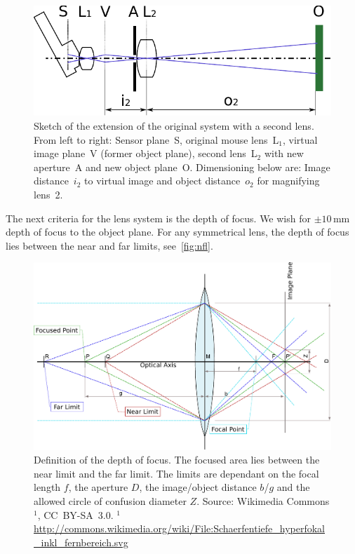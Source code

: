 \documentclass[12pt,a4paper]{article}
\begin{document}
\begin{figure}[htbp]
\begin{center}
\includegraphics[width=1\columnwidth]{figures/sketch-optic-2lens}
\caption{\label{fig:sk2l}
Sketch of the extension of the original system with a second lens.
From left to right: 
Sensor plane~S,
original mouse lens~L$_1$, 
virtual image plane~V (former object plane),
second lens~L$_2$ with new aperture~A and
new object plane~O.
Dimensioning below are: 
Image distance~$i_2$ to virtual image and object distance~$o_2$ for magnifying lens~2. %
}
\end{center}
\end{figure}

The next criteria for the lens system is the depth of focus.
We wish for $\pm 10$\,mm depth of focus to the object plane.
For any symmetrical lens, the depth of focus lies between the near and far limits, see~\autoref{fig:nfl}.

\begin{figure}[htbp]
\includegraphics[width=1\columnwidth]{figures/near_farpoints}
\caption{\label{fig:nfl}
Definition of the depth of focus.
The focused area lies between the near limit and the far limit.
The limits are dependant on the focal length $f$, the aperture $D$, the image/object distance $b$/$g$ and the allowed circle of confusion diameter $Z$.
\newline
Source: Wikimedia Commons$^1$, CC~BY-SA~3.0.
\newline
\newline
$^1$ \url{http://commons.wikimedia.org/wiki/File:Schaerfentiefe_hyperfokal_inkl_fernbereich.svg}
}
\end{figure}
\end{document}
